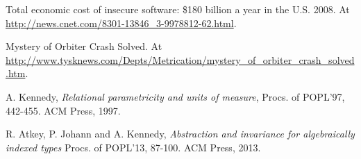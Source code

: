 \documentclass[a4paper,11pt]{article}
\begin{document}
{%





\begin{thebibliography}{}



\vspace*{-0.25in}



\setlength{\parindent}{0pt}

\setlength{\columnsep}{0.3in}

\setlength{\parskip}{-0.1ex}


\begin{footnotesize}
\begin{multicols}{2}

%
%


Total economic cost of insecure software: \$180 billion a year in the
U.S. 2008. At \url{http://news.cnet.com/8301-13846_3-9978812-62.html}.

Mystery of Orbiter Crash Solved. At \url{http://www.tysknews.com/Depts/Metrication/mystery_of_orbiter_crash_solved.htm}.

A. Kennedy,  {\em Relational parametricity and units of measure},
Procs. of POPL'97, 442-455. ACM Press, 1997.


R. Atkey, P. Johann and A. Kennedy, 
{\em 
Abstraction and invariance for algebraically indexed types}
Procs. of POPL'13, 87-100. ACM Press, 2013.



\end{multicols}
\end{footnotesize}

\end{thebibliography}



}
\end{document}
